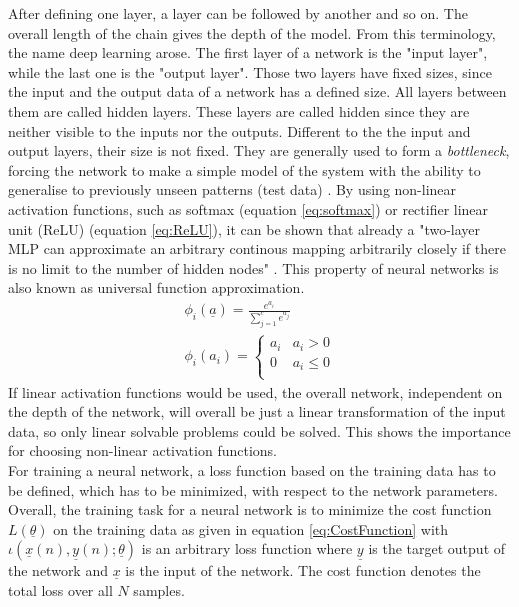 \documentclass[12pt,DIV14,BCOR12mm,a4paper,footexclude,headinclude,halfparskip-,twoside,openright,openany,cleardoubleempty,idxtotoc,bibtotoc]{scrreprt} %
\numberwithin{equation}{chapter}
\begin{document}
After defining one layer, a layer can be followed by another and so on. The overall length of the chain gives the depth of the model. From this terminology, the name deep learning arose. The first layer of a network is the "input layer", while the last one is the "output layer". Those two layers have fixed sizes, since the input and the output data of a network has a defined size. All layers between them are called hidden layers. These layers are called hidden since they are neither visible to the inputs nor the outputs. Different to the the input and output layers, their size is not fixed. They are generally used to form a \textit{bottleneck}, forcing the network to make a simple model of the system with the ability to generalise to previously unseen patterns (test data) \cite{Michie-et-al-1994}. By using non-linear activation functions, such as softmax (equation \ref{eq:softmax}) or rectifier linear unit (ReLU) (equation \ref{eq:ReLU}), it can be shown that already a "two-layer MLP can approximate an arbitrary continous mapping arbitrarily closely if there is no limit to the number of hidden nodes" \cite{Michie-et-al-1994}. This property of neural networks is also known as universal function approximation.
\begin{align}
	\phi_{i}(\underline{a}) = \frac{e^{a_{i}}}{\sum_{j=1}^{c}e^{a_{j}}} \label{eq:softmax}\\
	\phi_{i}(a_{i}) = \begin{cases} a_i & a_{i} > 0\\0 & a_{i} \leq 0\\ \end{cases} \label{eq:ReLU}
\end{align}
If linear activation functions would be used, the overall network, independent on the depth of the network, will overall be just a linear transformation of the input data, so only linear solvable problems could be solved. This shows the importance for choosing non-linear activation functions.\\
For training a neural network, a loss function based on the training data has to be defined, which has to be minimized, with respect to the network parameters. 
Overall, the training task for a neural network is to minimize the cost function $L(\underline{\theta})$ on the training data as given in equation \ref{eq:CostFunction} with $\iota(\underline{x}(n),\underline{y}(n);\underline{\theta})$ is an arbitrary loss function where $\underline{y}$ is the target output of the network and $\underline{x}$ is the input of the network. The cost function denotes the total loss over all $N$ samples.
\end{document}
